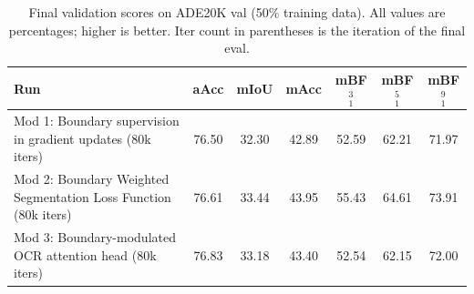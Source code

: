 \begin{table}[t]
\centering
\caption{Final validation scores on ADE20K val (50\% training data). All values are percentages; higher is better. Iter count in parentheses is the iteration of the final eval.}
\label{tab:absolute-scores}
\begin{tabular}{lcccccc}
\toprule
\textbf{Run} & \textbf{aAcc} & \textbf{mIoU} & \textbf{mAcc} & \textbf{mBF$_1^{3}$} & \textbf{mBF$_1^{5}$} & \textbf{mBF$_1^{9}$} \\
\midrule
Mod 1: Boundary supervision in gradient updates (80k iters) & 76.50 & 32.30 & 42.89 & 52.59 & 62.21 & 71.97 \\
Mod 2: Boundary Weighted Segmentation Loss Function (80k iters) & 76.61 & 33.44 & 43.95 & 55.43 & 64.61 & 73.91 \\
Mod 3: Boundary-modulated OCR attention head (80k iters) & 76.83 & 33.18 & 43.40 & 52.54 & 62.15 & 72.00 \\
\bottomrule
\end{tabular}
\end{table}
